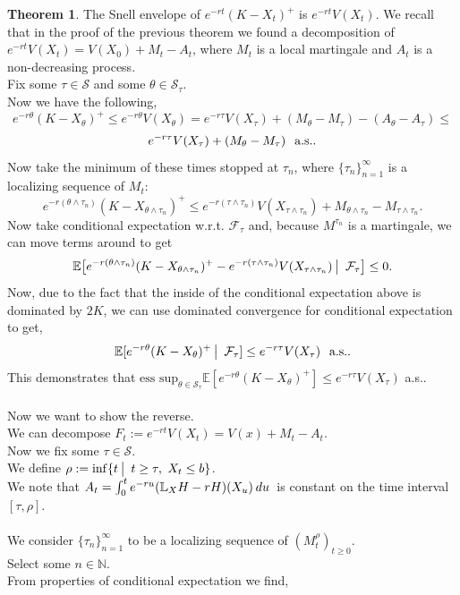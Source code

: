 \documentclass[12pt]{article}
\newcommand{\cF}{\mathcal{F}}
\newcommand{\cS}{\mathcal{S}}
\newcommand{\E}{\mathbb{E}}
\newcommand{\N}{\mathbb{N}}
\newcommand{\bL}{\mathbb{L}}
\newcommand{\quantifyspace}{\hspace{2px} \big | \hspace{5px}}
\newcommand{\df}[1]{\hspace{2 px} d #1 \hspace{2 px}}
\newcommand{\spc}{\hspace{7 px}}
\newcommand{\sspc}{\hspace{3 px}}
\newcommand{\als}{\text{a.s.}}
\newcommand{\esssup}{\text{ess sup}}
\theoremstyle{definition}
\newtheorem{thm}{Theorem}
\begin{document}
\begin{thm}
    The Snell envelope of $e^{-rt} (K - X_t)^+$ is $e^{-rt} V(X_t)$.
    \proof
We recall that in the proof of the previous theorem we found a decomposition of $e^{-rt} V(X_t) = V(X_0) + M_t - A_t$, where $M_t$ is a local martingale and $A_t$ is a non-decreasing process. \\
Fix some $\tau \in \cS$ and some $\theta \in \cS_\tau$. \\
Now we have the following,
\[
    e^{-r\theta}(K - X_\theta)^+ \leq e^{-r\theta} V(X_\theta) = e^{-r\tau} V(X_\tau) + (M_\theta - M_\tau) - (A_\theta - A_\tau) \leq
\]
\[
    e^{-r\tau} V(X_\tau) + (M_\theta - M_\tau) \spc \als.
\]
Now take the minimum of these times stopped at $\tau_n$, where $\{\tau_n\}_{n=1}^\infty$ is a localizing sequence of $M_t$:
\[
    e^{-r (\theta \wedge \tau_n)} (K - X_{\theta \wedge \tau_n})^+ \leq e^{-r(\tau \wedge \tau_n)} V(X_{\tau  \wedge \tau_n}) + M_{\theta \wedge \tau_n} - M_{\tau \wedge \tau_n}.
\]
Now take conditional expectation w.r.t. $\cF_\tau$ and, because $M^{\tau_n}$ is a martingale, we can move terms around to get
\[
    \E \big [ e^{-r (\theta \wedge \tau_n)} (K - X_{\theta \wedge \tau_n})^+ - e^{-r (\tau \wedge \tau_n)} V(X_{\tau \wedge \tau_n}) \quantifyspace \cF_\tau \big ] \leq 0.
\]
Now, due to the fact that the inside of the conditional expectation above is dominated by $2K$, we can use dominated convergence for conditional expectation to get,
\[
    \E[e^{-r \theta}(K - X_\theta)^+ \quantifyspace \cF_\tau] \leq e^{-r \tau}V(X_\tau) \spc \als.
\]
This demonstrates that $\esssup_{\theta \in \cS_\tau} \E[e^{-r \theta} (K - X_\theta)^+] \leq e^{-r \tau} V(X_\tau)$ a.s.. \\
\\
Now we want to show the reverse. \\
We can decompose $F_t := e^{-rt} V(X_{t}) = V(x) + M_t - A_t$. \\
Now we fix some $\tau \in \cS$. \\
We define $\rho := \inf \{t \quantifyspace t \geq \tau, \sspc X_t \leq b \}$. \\
We note that $A_t = \int_0^t e^{-ru} (\bL_X H - r H)(X_u) \df{u}$ is constant on the time interval $[\tau, \rho]$. \\
\\
We consider $\{\tau_n\}_{n=1}^\infty$ to be a localizing sequence of $(M^{\rho}_t)_{t \geq 0}$. \\
Select some $n \in \N$. \\
From properties of conditional expectation we find,

\end{thm}
\end{document}
